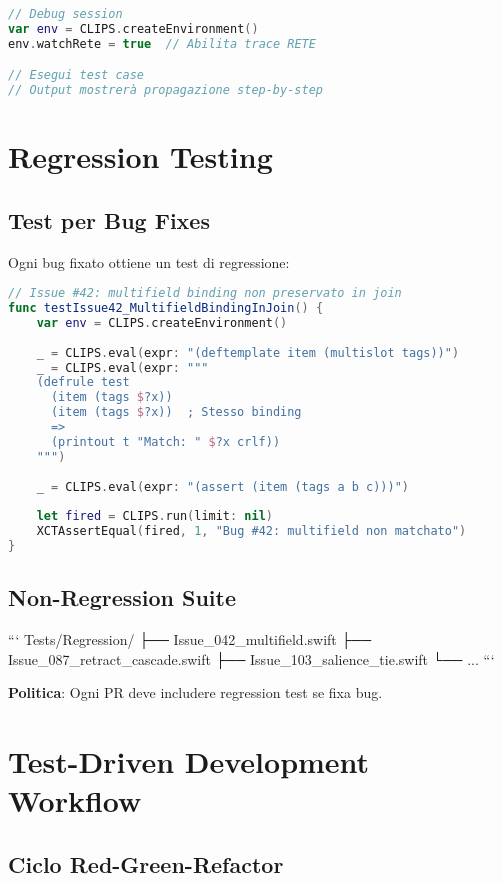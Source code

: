 \begin{lstlisting}[language=Swift]
// Debug session
var env = CLIPS.createEnvironment()
env.watchRete = true  // Abilita trace RETE

// Esegui test case
// Output mostrerà propagazione step-by-step
\end{lstlisting}

\section{Regression Testing}

\subsection{Test per Bug Fixes}

Ogni bug fixato ottiene un test di regressione:

\begin{lstlisting}[language=Swift]
// Issue #42: multifield binding non preservato in join
func testIssue42_MultifieldBindingInJoin() {
    var env = CLIPS.createEnvironment()
    
    _ = CLIPS.eval(expr: "(deftemplate item (multislot tags))")
    _ = CLIPS.eval(expr: """
    (defrule test
      (item (tags $?x))
      (item (tags $?x))  ; Stesso binding
      =>
      (printout t "Match: " $?x crlf))
    """)
    
    _ = CLIPS.eval(expr: "(assert (item (tags a b c)))")
    
    let fired = CLIPS.run(limit: nil)
    XCTAssertEqual(fired, 1, "Bug #42: multifield non matchato")
}
\end{lstlisting}

\subsection{Non-Regression Suite}

```
Tests/Regression/
├── Issue_042_multifield.swift
├── Issue_087_retract_cascade.swift
├── Issue_103_salience_tie.swift
└── ...
```

\textbf{Politica}: Ogni PR deve includere regression test se fixa bug.

\section{Test-Driven Development Workflow}

\subsection{Ciclo Red-Green-Refactor}


